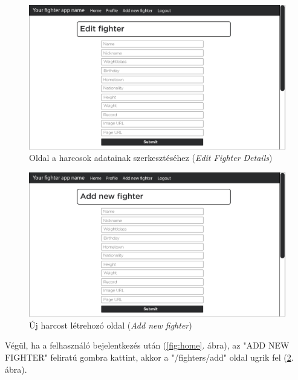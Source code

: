 \begin{figure}[htb]
\centering
\includegraphics[scale=0.7]{kepek/edit_fighter.jpg}
\caption{Oldal a harcosok adatainak szerkesztéséhez (\textit{Edit Fighter Details})}
\label{fig:edit}
\end{figure}

\begin{figure}[htb]
\centering
\includegraphics[scale=0.7]{kepek/add_new_fighter.jpg}
\caption{Új harcost létrehozó oldal (\textit{Add new fighter})}
\label{fig:add}
\end{figure}
\newpage
Végül, ha a felhasználó bejelentkezés után (\ref{fig:home}. ábra), az "ADD NEW FIGHTER" feliratú gombra kattint, akkor a "/fighters/add" oldal ugrik fel (\ref{fig:add}. ábra).
